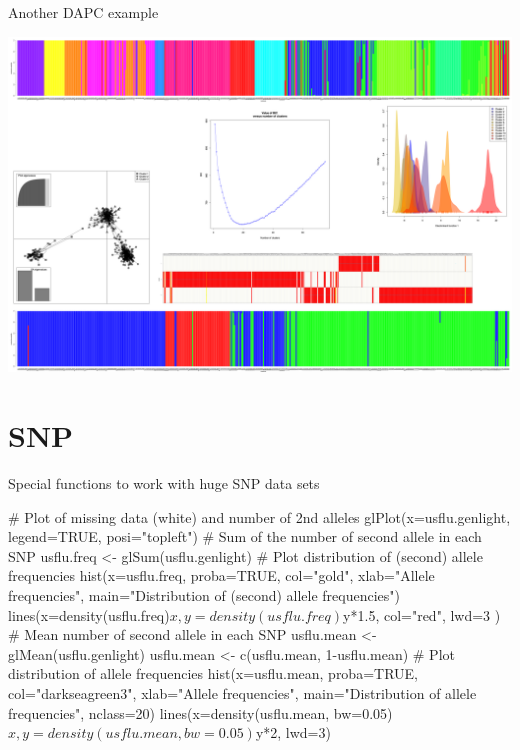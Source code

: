 \documentclass[compress, ucs, xelatex, 11pt, xcolor=svgnames,
  hyperref={
    bookmarks=true,
    unicode=true,
    colorlinks=true,
    pdftitle={Molecular data in R},
    plainpages=false,
    pdfauthor={Vojtech Zeisek},
    pdfsubject={Course about phylogeny and evolution in R},
    pdfcreator={XeLaTeX},
    pdfkeywords={R, evolution, phylogeny, molecular data},
    linkcolor=Tomato,
    anchorcolor=SaddleBrown,
    citecolor=Goldenrod,
    filecolor=DarkMagenta,
    menucolor=Sienna,
    urlcolor=DarkTurquoise,
    pdftex},
  url={hyphens, lowtilde} %
  ]{beamer}
\begin{document}
\begin{frame}{Another DAPC example}
  \begin{center}
    \includegraphics[width=\textwidth-1.5cm]{dapc.png}
  \end{center}
\end{frame}

\section{SNP}

\begin{frame}[fragile]{Special functions to work with huge SNP data sets}
  \begin{spluscode}
    # Plot of missing data (white) and number of 2nd alleles
    glPlot(x=usflu.genlight, legend=TRUE, posi="topleft")
    # Sum of the number of second allele in each SNP
    usflu.freq <- glSum(usflu.genlight)
    # Plot distribution of (second) allele frequencies
    hist(x=usflu.freq, proba=TRUE, col="gold", xlab="Allele
      frequencies", main="Distribution of (second) allele frequencies")
    lines(x=density(usflu.freq)$x, y=density(usflu.freq)$y*1.5,
      col="red", lwd=3 )
    # Mean number of second allele in each SNP
    usflu.mean <- glMean(usflu.genlight)
    usflu.mean <- c(usflu.mean, 1-usflu.mean)
    # Plot distribution of allele frequencies
    hist(x=usflu.mean, proba=TRUE, col="darkseagreen3",
      xlab="Allele frequencies", main="Distribution of allele
      frequencies", nclass=20)
    lines(x=density(usflu.mean, bw=0.05)$x, y=density(usflu.mean,
      bw=0.05)$y*2, lwd=3)
  \end{spluscode}
\end{frame}
\end{document}
